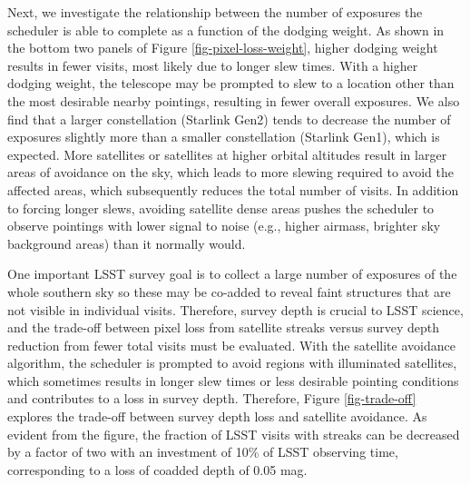 \documentclass[twocolumn]{aastex631}
\begin{document}
\begin{figure*}[ht!]
\caption{Illustration of changes in the mean streak length in all visits including those with no streak (top left), the fraction of visits with streaks
(top right), the number of acquired visits in year 1 (bottom left) and coadded depth in the $g$ band (bottom right) as a function of dodging basis function weight (starting with essentially no dodging on the left). 
Note that to reduce the fraction of visits with streaks by about a factor of two, satellite avoidance will require 10\% of total observing time.
\vspace{3em}
\label{fig-pixel-loss-weight}}
\end{figure*}

Next, we investigate the relationship between the number of exposures the scheduler is able to complete as a function of the dodging weight. As shown in the bottom two panels of Figure \ref{fig-pixel-loss-weight}, higher dodging weight results in fewer visits, most likely due to longer slew times. With a higher dodging weight, the telescope may be prompted to slew to a location other than the most desirable nearby pointings, resulting in fewer overall exposures. We also find that a larger constellation (Starlink Gen2) tends to decrease the number of exposures slightly more than a smaller constellation (Starlink Gen1), which is expected. More satellites or satellites at higher orbital altitudes result in larger areas of avoidance on the sky, which leads to more slewing required to avoid the affected areas, which subsequently reduces the total number of visits. In addition to forcing longer slews, avoiding satellite dense areas pushes the scheduler to observe pointings with lower signal to noise (e.g., higher airmass, brighter sky background areas) than it normally would.

One important LSST survey goal is to collect a large number of exposures of the whole southern sky so these may be co-added to reveal faint structures that are not visible in individual visits. Therefore, survey depth is crucial to LSST science, and the trade-off between pixel loss from satellite streaks versus survey depth reduction from fewer total visits must be evaluated. With the satellite avoidance algorithm, the scheduler is prompted to avoid regions with illuminated satellites, which sometimes results in longer slew times or less desirable pointing conditions and contributes to a loss in survey depth. Therefore, Figure \ref{fig-trade-off} explores the trade-off between survey depth loss and satellite avoidance. As evident
from the figure, the fraction of LSST visits with streaks can be decreased by a factor of two with 
an investment of 10\% of LSST observing time, corresponding to a loss of coadded depth of 0.05 mag. 
\end{document}
